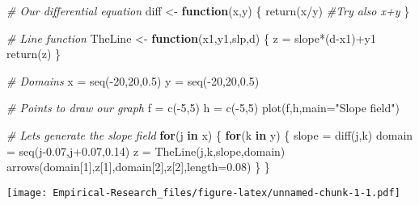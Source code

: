 \documentclass[
]{book}
\newenvironment{Shaded}{\begin{snugshade}}{\end{snugshade}}
\newcommand{\AttributeTok}[1]{\textcolor[rgb]{0.77,0.63,0.00}{#1}}
\newcommand{\CommentTok}[1]{\textcolor[rgb]{0.56,0.35,0.01}{\textit{#1}}}
\newcommand{\ControlFlowTok}[1]{\textcolor[rgb]{0.13,0.29,0.53}{\textbf{#1}}}
\newcommand{\DecValTok}[1]{\textcolor[rgb]{0.00,0.00,0.81}{#1}}
\newcommand{\FloatTok}[1]{\textcolor[rgb]{0.00,0.00,0.81}{#1}}
\newcommand{\FunctionTok}[1]{\textcolor[rgb]{0.00,0.00,0.00}{#1}}
\newcommand{\NormalTok}[1]{#1}
\newcommand{\OtherTok}[1]{\textcolor[rgb]{0.56,0.35,0.01}{#1}}
\newcommand{\SpecialCharTok}[1]{\textcolor[rgb]{0.00,0.00,0.00}{#1}}
\newcommand{\StringTok}[1]{\textcolor[rgb]{0.31,0.60,0.02}{#1}}
\begin{document}
\begin{Shaded}
\begin{Highlighting}[]
\CommentTok{\# Our differential equation}
\NormalTok{diff }\OtherTok{\textless{}{-}} \ControlFlowTok{function}\NormalTok{(x,y)}
\NormalTok{\{}
  \FunctionTok{return}\NormalTok{(x}\SpecialCharTok{/}\NormalTok{y) }\CommentTok{\#Try also x+y}
\NormalTok{\}}

\CommentTok{\# Line function}
\NormalTok{TheLine }\OtherTok{\textless{}{-}} \ControlFlowTok{function}\NormalTok{(x1,y1,slp,d)}
\NormalTok{\{}
\NormalTok{  z }\OtherTok{=}\NormalTok{ slope}\SpecialCharTok{*}\NormalTok{(d}\SpecialCharTok{{-}}\NormalTok{x1)}\SpecialCharTok{+}\NormalTok{y1}
  \FunctionTok{return}\NormalTok{(z)}
\NormalTok{\}}

\CommentTok{\# Domains}
\NormalTok{x }\OtherTok{=} \FunctionTok{seq}\NormalTok{(}\SpecialCharTok{{-}}\DecValTok{20}\NormalTok{,}\DecValTok{20}\NormalTok{,}\FloatTok{0.5}\NormalTok{)}
\NormalTok{y }\OtherTok{=} \FunctionTok{seq}\NormalTok{(}\SpecialCharTok{{-}}\DecValTok{20}\NormalTok{,}\DecValTok{20}\NormalTok{,}\FloatTok{0.5}\NormalTok{)}

\CommentTok{\# Points to draw our graph}
\NormalTok{f }\OtherTok{=} \FunctionTok{c}\NormalTok{(}\SpecialCharTok{{-}}\DecValTok{5}\NormalTok{,}\DecValTok{5}\NormalTok{) }
\NormalTok{h }\OtherTok{=} \FunctionTok{c}\NormalTok{(}\SpecialCharTok{{-}}\DecValTok{5}\NormalTok{,}\DecValTok{5}\NormalTok{)}
\FunctionTok{plot}\NormalTok{(f,h,}\AttributeTok{main=}\StringTok{"Slope field"}\NormalTok{)}


\CommentTok{\# Let\textquotesingle{}s generate the slope field}
\ControlFlowTok{for}\NormalTok{(j }\ControlFlowTok{in}\NormalTok{ x)}
\NormalTok{\{}
  \ControlFlowTok{for}\NormalTok{(k }\ControlFlowTok{in}\NormalTok{ y)}
\NormalTok{  \{}
\NormalTok{    slope }\OtherTok{=} \FunctionTok{diff}\NormalTok{(j,k)}
\NormalTok{    domain }\OtherTok{=} \FunctionTok{seq}\NormalTok{(j}\FloatTok{{-}0.07}\NormalTok{,j}\FloatTok{+0.07}\NormalTok{,}\FloatTok{0.14}\NormalTok{)}
\NormalTok{    z }\OtherTok{=} \FunctionTok{TheLine}\NormalTok{(j,k,slope,domain)}
    \FunctionTok{arrows}\NormalTok{(domain[}\DecValTok{1}\NormalTok{],z[}\DecValTok{1}\NormalTok{],domain[}\DecValTok{2}\NormalTok{],z[}\DecValTok{2}\NormalTok{],}\AttributeTok{length=}\FloatTok{0.08}\NormalTok{)}
\NormalTok{  \}}
\NormalTok{\}}
\end{Highlighting}
\end{Shaded}

\texttt{[image: Empirical-Research\_files/figure-latex/unnamed-chunk-1-1.pdf]}
\end{document}
